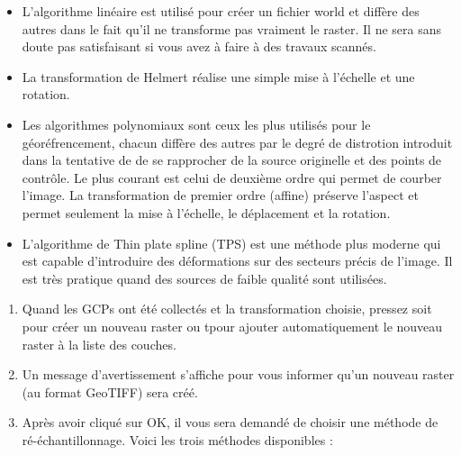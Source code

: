 \begin{enumerate}
\begin{enumerate}
\begin{itemize}
\item L'algorithme linéaire est utilisé pour créer un fichier world et diffère des autres dans le fait qu'il ne transforme pas vraiment le raster. Il ne sera sans doute pas satisfaisant si vous avez à faire à des travaux scannés.
\item La transformation de Helmert réalise une simple mise à l'échelle et une rotation.
\item Les algorithmes polynomiaux sont ceux les plus utilisés pour le géoréfrencement, chacun diffère des autres par le degré de distrotion introduit dans la tentative de de se rapprocher de la source originelle et des points de contrôle. Le plus courant est celui de deuxième ordre qui permet de courber l'image. La transformation de premier ordre (affine) préserve l'aspect et permet seulement la mise à l'échelle, le déplacement et la rotation.
\item L'algorithme de Thin plate spline (TPS)  est une méthode plus moderne qui est capable  d'introduire des déformations sur des secteurs précis de l'image. Il est très pratique quand des sources de faible qualité sont utilisées.
\end{itemize}

\label{georeferencer_running}

\begin{enumerate}
\item Quand les GCPs ont été collectés et la transformation choisie, pressez soit  pour créer un nouveau raster ou  tpour ajouter automatiquement le nouveau raster à la liste des couches.
\item Un message d'avertissement s'affiche pour vous informer qu'un nouveau raster (au format GeoTIFF) sera créé.
\item Après avoir cliqué sur OK, il vous sera demandé de choisir une méthode de ré-échantillonnage. Voici les  trois méthodes disponibles :


\end{enumerate}
\end{enumerate}
\end{enumerate}
